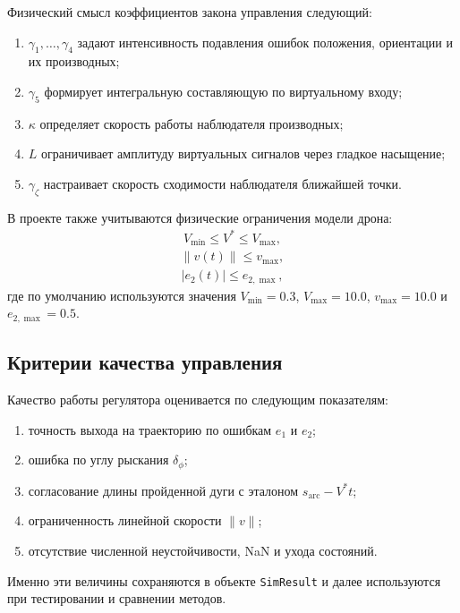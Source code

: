 Физический смысл коэффициентов закона управления следующий:
\begin{enumerate}
    \item $\gamma_1,\dots,\gamma_4$ задают интенсивность подавления ошибок положения, ориентации и их производных;
    \item $\gamma_5$ формирует интегральную составляющую по виртуальному входу;
    \item $\kappa$ определяет скорость работы наблюдателя производных;
    \item $L$ ограничивает амплитуду виртуальных сигналов через гладкое насыщение;
    \item $\gamma_{\zeta}$ настраивает скорость сходимости наблюдателя ближайшей точки.
\end{enumerate}\hfill\break
В проекте также учитываются физические ограничения модели дрона:
\begin{gather}
    V_{\min} \le V^{\ast} \le V_{\max},
\end{gather}
\begin{gather}
    \|v(t)\| \le v_{\max},
\end{gather}
\begin{gather}
    |e_2(t)| \le e_{2,\max},
\end{gather}
где по умолчанию используются значения $V_{\min}=0.3$, $V_{\max}=10.0$, $v_{\max}=10.0$ и $e_{2,\max}=0.5$.

\subsection{Критерии качества управления}

Качество работы регулятора оценивается по следующим показателям:
\begin{enumerate}
    \item точность выхода на траекторию по ошибкам $e_1$ и $e_2$;
    \item ошибка по углу рыскания $\delta_{\phi}$;
    \item согласование длины пройденной дуги с эталоном $s_{\mathrm{arc}} - V^{\ast} t$;
    \item ограниченность линейной скорости $\|v\|$;
    \item отсутствие численной неустойчивости, NaN и ухода состояний.
\end{enumerate}

Именно эти величины сохраняются в объекте \texttt{SimResult} и далее используются при тестировании и сравнении методов.